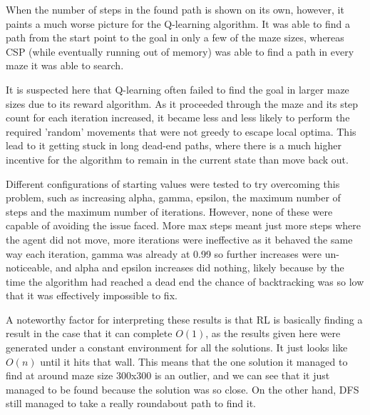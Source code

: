 \documentclass{article}
\newcommand\tab[1][1cm]{\hspace*{#1}}
\begin{document}
         \tab When the number of steps in the found path is shown on its own, 
         however, it paints a much worse picture for the Q-learning algorithm. 
         It was able to find a path from the start point to the goal in 
         only a few of the maze sizes, whereas CSP (while eventually 
         running out of memory) was able to find a path in every maze 
         it was able to search.

         \tab It is suspected here that Q-learning often failed to find the goal 
         in larger maze sizes due to its reward algorithm. As it proceeded 
         through the maze and its step count for each iteration increased, 
         it became less and less likely to perform the required 'random' 
         movements that were not greedy to escape local optima. This lead
         to it getting stuck in long dead-end paths, where there is a much 
         higher incentive for the algorithm to remain
         in the current state than move back out.

         \tab Different configurations of starting values were tested to try 
         overcoming this problem, such as increasing alpha, gamma, epsilon, 
         the maximum number of steps and the maximum number of iterations. 
         However, none of these were capable of avoiding the issue faced. 
         More max steps meant just more steps where the agent did not move, more
         iterations were ineffective as it behaved the same way each iteration, 
         gamma was already at 0.99 so further increases were un-noticeable, 
         and alpha and epsilon increases did nothing, likely because by the 
         time the algorithm had reached a dead end the chance of backtracking 
         was so low that it was effectively impossible to fix.


         A noteworthy factor for interpreting these results is that RL is
         basically finding a result in the case that it can complete $O(1)$, as
         the results given here were generated under a constant environment for 
         all the solutions. It just looks like $O(n)$ until it hits that wall. 
         This means that the one solution it managed to find
         at around maze size 300x300 is an outlier, and we can see that it
         just managed to be found because the solution was so close. On the
         other hand, DFS still managed to take a really roundabout path to find
         it.
\end{document}
